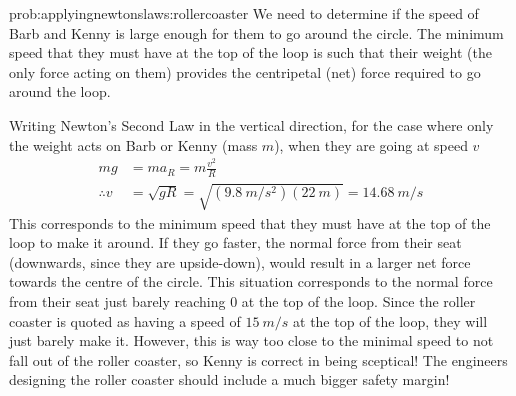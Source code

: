\begin{solution}{prob:applyingnewtonslaws:rollercoaster}\label{soln:applyingnewtonslaws:rollercoaster} 
We need to determine if the speed of Barb and Kenny is large enough for them to go around the circle. The minimum speed that they must have at the top of the loop is such that their weight (the only force acting on them) provides the centripetal (net) force required to go around the loop. 

Writing Newton's Second Law in the vertical direction, for the case where only the weight acts on Barb or Kenny (mass $m$), when they are going at speed $v$
\begin{align*}
mg &= ma_R = m\frac{v^2}{R}\\
\therefore v &= \sqrt{gR} = \sqrt{(\SI{9.8}{m/s^2})(\SI{22}{m})}=\SI{14.68}{m/s}
\end{align*}
This corresponds to the minimum speed that they must have at the top of the loop to make it around. If they go faster, the normal force from their seat (downwards, since they are upside-down), would result in a larger net force towards the centre of the circle. This situation corresponds to the normal force from their seat just barely reaching 0 at the top of the loop. Since the roller coaster is quoted as having a speed of $\SI{15}{m/s}$ at the top of the loop, they will just barely make it. However, this is way too close to the minimal speed to not fall out of the roller coaster, so Kenny is correct in being sceptical! The engineers designing the roller coaster should include a much bigger safety margin! 
\end{solution}



